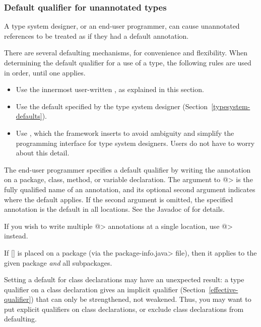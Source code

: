 \subsubsection{Default qualifier for unannotated types\label{defaults}}

A type system designer, or an end-user programmer, can cause unannotated
references to be treated as if they had a default annotation.

There are several defaulting mechanisms, for convenience and flexibility.
When determining the default qualifier for a use of a type, the following
rules are used in order, until one applies.
\begin{itemize}
\item
  Use the innermost user-written , as explained in
  this section.
\item
  Use the default specified by the type system designer
  (Section~\ref{typesystem-defaults}).
\item
  Use , which the framework
  inserts to avoid ambiguity and simplify the programming interface for
  type system designers.  Users do not have to worry about this detail.
\end{itemize}



The end-user programmer specifies a default qualifier by writing the 
annotation on a package, class, method, or variable declaration.  The
argument to \<@> is the fully qualified  name of an
annotation, and its optional second argument indicates where the default
applies.  If the second argument is omitted, the specified annotation is
the default in all locations.  See the Javadoc of  for details.

If you wish to write multiple 
\<@> annotations at a single location,
use 
\<@> instead.

If [] is placed on a package (via the
\<package-info.java> file), then it applies to the given package \emph{and}
all subpackages.

Setting a default for class declarations may have an unexpected result:  a
type qualifier on a class declaration gives an implicit qualifier
(Section~\ref{effective-qualifier}) that can only be strengthened, not
weakened.  Thus, you may want to put explicit qualifiers on class
declarations, or exclude class declarations from defaulting.

